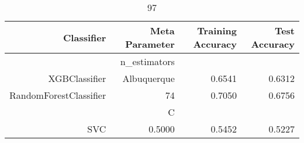 
\begin{table}[H]
    \caption{97}
    \centering
    \begin{tabular}{|r|r|r|r|}
        \hline
        Classifier &Meta Parameter &Training Accuracy
        &Test Accuracy\\
        \hline
        &n\_estimators &\multicolumn{2}{|r|}{}\\
        \hline
        XGBClassifier &Albuquerque &0.6541 &0.6312\\
        \hline
        RandomForestClassifier &74 &0.7050 &0.6756\\
        \hline
        &C &\multicolumn{2}{|r|}{}\\
        \hline
        SVC &0.5000 &0.5452 &0.5227\\
        \hline
    \end{tabular}
\end{table}
